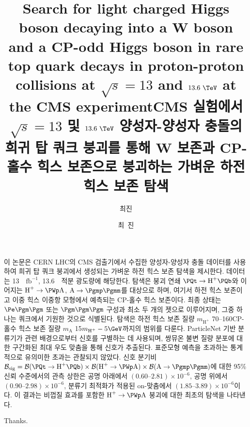 \documentclass[oneside,phd,openright]{Style/snuthesis}
\title{Search for light charged Higgs boson decaying into a W boson and a CP-odd Higgs boson in rare top quark decays in proton-proton collisions at $\sqrt{s} = 13$ and $13.6~\TeV$ at the CMS experiment}
\title*{CMS 실험에서 $\sqrt{s} = 13$ 및 $13.6~\TeV$ 양성자-양성자 충돌의 희귀 탑 쿼크 붕괴를 통해 W 보존과 CP-홀수 힉스 보존으로 붕괴하는 가벼운 하전 힉스 보존 탐색}
\author{최진}
\author*{최~진} %
\newcommand{\PHp}{\ensuremath{\text{H}^+}\xspace}
\newcommand{\mHc}{\ensuremath{m_{\PHp}}\xspace}
\newcommand{\mA}{\ensuremath{m_{\PA}}\xspace}
\newcommand{\PA}{\ensuremath{\text{A}}\xspace}
\renewcommand{\fbinv}{\ensuremath{\text{fb}^{-1}}\xspace}
\begin{document}
\makefrontcover
\makefrontcover
\makeapproval

\cleardoublepage
{}




\tableofcontents
\listoffigures
\listoftables

\cleardoublepage
{}





\appendix



\begingroup
\sloppy
\printbibliography
\endgroup

\begin{abstractalt}
이 논문은 CERN LHC의 CMS 검출기에서 수집한 양성자-양성자 충돌 데이터를 사용하여 희귀 탑 쿼크 붕괴에서 생성되는 가벼운 하전 힉스 보존 탐색을 제시한다. 데이터는 13~~\fbinv, 13.6~~ 적분 광도량에 해당한다. 탐색은 붕괴 연쇄 $\PQt \to \PHp\PQb$와 이어지는 $\PHp \to \PWp\PA$, $\PA \to \Pgmp\Pgmm$를 대상으로 하며, 여기서  하전 힉스 보존이고  이중 힉스 이중항 모형에서 예측되는 CP-홀수 힉스 보존이다. 최종 상태는 $\Pe\Pgm\Pgm$ 또는 $\Pgm\Pgm\Pgm$ 구성과 최소 두 개의 젯으로 이루어지며, 그중 하나는 \PQb 쿼크에서 기원한 것으로 식별된다. 탐색은 하전 힉스 보존 질량 $\mHc$ 70--160 CP-홀수 힉스 보존 질량 $\mA$ 15 $\mHc - 5\GeV$까지의 범위를 다룬다. ParticleNet 기반 분류기가 \PZ 관련 배경으로부터 신호를 구별하는 데 사용되며, 쌍뮤온 불변 질량 분포에 대한 구간화된 최대 우도 맞춤을 통해 신호가 추출된다. 표준모형 예측을 초과하는 통계적으로 유의미한 초과는 관찰되지 않았다. 신호 분기비 $\mathcal{B}_{\text{sig}} = \mathcal{B}(\PQt \to \PHp\PQb) \times \mathcal{B}(\PHp \to \PWp\PA) \times \mathcal{B}(\PA \to \Pgmp\Pgmm)$에 대한 95\% 신뢰 수준에서의 관측 상한은 \PZ 공명 아래에서 $(0.60\text{--}2.81) \times 10^{-6}$, \PZ 공명 위에서 $(0.90\text{--}2.98) \times 10^{-6}$, 분류기 최적화가 적용된 on-\PZ 맞춤에서 $(1.85\text{--}3.89) \times 10^{-6}$이다. 이 결과는 비껍질 효과를 포함한 $\PHp \to \PWp\PA$ 붕괴에 대한 최초의 탐색을 나타낸다.
\end{abstractalt}

\acknowledgement
Thanks.
\end{document}
